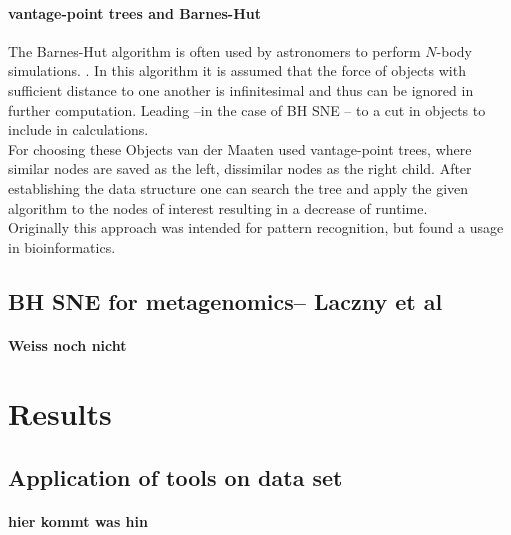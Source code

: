 \documentclass[twocolumn]{bmcart}%
\begin{document}
\paragraph*{vantage-point trees and Barnes-Hut }
 The Barnes-Hut algorithm is often used by astronomers to perform $N$-body simulations.\cite{DBLP:journals/corr/abs-1301-3342} . In this algorithm it is assumed that the force of objects with sufficient distance to one another is infinitesimal and thus can be ignored in further computation. Leading --in the case of BH SNE -- to a cut in objects to include in calculations.\\
 For choosing these Objects van der Maaten used vantage-point trees, where similar nodes are saved as the left, dissimilar nodes as the right child. After establishing the data structure one can search the tree and apply the given algorithm to the nodes of interest resulting in a decrease of runtime.\\
 Originally this approach was intended for pattern recognition, but found a usage in bioinformatics.
\subsection*{BH SNE for metagenomics-- Laczny et al}
\paragraph*{Weiss noch nicht}
\section*{Results}
\subsection*{Application of tools on data set}
\paragraph*{hier kommt was hin}

\end{document}
